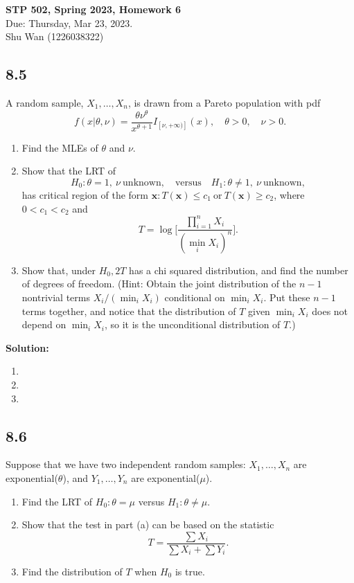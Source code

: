 \documentclass[11pt]{article}
\newcommand{\x}{\mathbf{x}}
\newcommand{\Sol}{\par {\bf Solution:}}
\newcommand{\sample}[1]{#1_1 , \dots , #1_n}
\begin{document}
\begin{center}
\Large{
\textbf{STP 502, Spring 2023, Homework 6} \\
Due: Thursday, Mar 23, 2023. \\
Shu Wan (1226038322)
}
\end{center}

\subsection*{8.5}
A random sample, $\sample{X}$, is drawn from a Pareto population with pdf
\[
f(x|\theta, \nu) = \frac{\theta\nu^\theta}{x^{\theta+1}}I_{[\nu, +\infty)]}(x), \quad \theta > 0, \quad \nu > 0.
\]
\begin{enumerate}[label=(\alph*)]
    \item Find the MLEs of $\theta$ and $\nu$.
    \item Show that the LRT of
    \[
    H_0: \theta = 1, ~\nu ~\text{unknown}, \quad \text{versus} \quad H_1: \theta \neq 1, ~\nu ~\text{unknown},
    \]
    has critical region of the form ${\x: T(\x) \le c_1 ~\text{or}~ T(\x) \ge c_2}$, where $0 < c_1 < c_2$ and 
    \[
    T = \log \Bigg[\frac{\prod \limits_{i=1}^n X_i}{(\min \limits_i X_i)^n}\Bigg].
    \]
    \item Show that, under $H_0, 2T$ has a chi squared distribution, and find the number of degrees of freedom. (Hint: Obtain the joint distribution of the $n - 1$ nontrivial terms $X_i /(\min_i X_i)$ conditional on $\min_i X_i$. Put these $n - 1$ terms together, and notice that the distribution of $T$ given $\min_i X_i$ does not depend on $\min_i X_i$, so it is the unconditional distribution of $T$.)
\end{enumerate}

\Sol

\begin{enumerate}[label=(\alph*)]
    \item
    \item
    \item
\end{enumerate}

\subsection*{8.6}

Suppose that we have two independent random samples: $\sample{X}$ are exponential($\theta$),
and $\sample{Y}$ are exponential($\mu$).

\begin{enumerate}[label=(\alph*)]
    \item Find the LRT of $H_0: \theta = \mu$ versus $H_1: \theta \neq \mu$.
    \item Show that the test in part (a) can be based on the statistic
    \[
    T = \frac{\sum X_i}{\sum X_i + \sum Y_i}.
    \]
    \item Find the distribution of $T$ when $H_0$ is true.
\end{enumerate}
\end{document}
